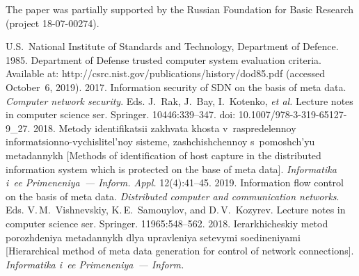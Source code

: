    
   
   



 \Ack
   \noindent
   The paper was partially supported by the Russian Foundation for Basic Research (project  
18-07-00274).



  \begin{multicols}{2}

\renewcommand{\bibname}{\protect\rmfamily References}

{\small\frenchspacing
 {%
 \begin{thebibliography}{99}
U.S.\ National Institute of Standards and Technology, Department of Defence. 1985.
Department of Defense trusted computer system evaluation criteria. Available at: {\sf 
http://csrc.nist.gov/publications/history/dod85.pdf} (accessed October~6, 2019).
 2017. Information 
security of SDN on the basis of meta data. 
\textit{Computer network security}. Eds. J.~Rak, J.~Bay, I.~Kotenko, 
\textit{et al.}
Lecture notes in computer science ser. Springer. 
10446:339--347. doi: 10.1007/978-3-319-65127-9\_27.
 2018. Metody 
identifikatsii zakhvata khosta v~raspredelennoy informatsionno-vychislitel'noy sisteme, 
zashchishchennoy s~pomoshch'yu metadannykh [Methods of identification of host capture in the 
distributed information system which is protected on the base of meta data]. \textit{Informatika i~ee 
Primeneniya~--- Inform. Appl.} 12(4):41--45. 
 2019. Information flow control 
on the basis of meta data. \textit{Distributed computer and communication networks}.
 Eds. V.\,M.~Vishnevskiy, 
K.\,E.~Samouylov, and D.\,V.~Ko\-zy\-rev. 
Lecture notes
in computer science ser. Springer. 11965:548--562.
 2018. Ierarkhicheskiy metod 
porozhdeniya metadannykh dlya upravleniya setevymi soedineniyami [Hierarchical method of meta 
data generation for control of network connections]. \textit{Informatika i~ee Primeneniya~--- Inform. 
}
\end{thebibliography}}}
\end{multicols}
